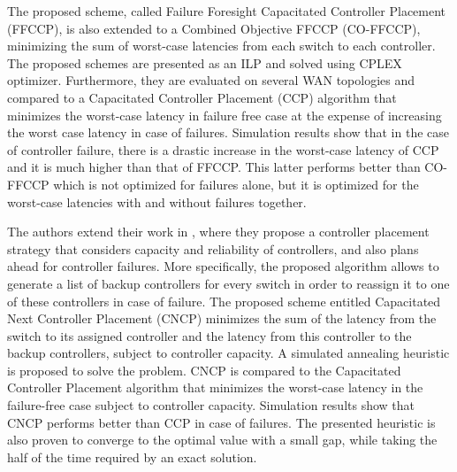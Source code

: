 \documentclass[a4paper,10pt]{article}
\begin{document}
The proposed scheme, called Failure Foresight Capacitated Controller Placement (FFCCP), is also extended to a Combined Objective FFCCP (CO-FFCCP), minimizing the sum of worst-case latencies from each switch to each controller. The proposed schemes are presented as an ILP and solved using CPLEX optimizer. Furthermore, they are evaluated on several WAN topologies and compared to a Capacitated Controller Placement (CCP) algorithm that minimizes the worst-case latency in failure free case at the expense of increasing the worst case latency in case of failures. Simulation results show that in the case of controller failure,  there is a drastic increase in the worst-case latency of CCP and it is much higher than that of FFCCP. This latter performs better than CO-FFCCP which is not optimized for failures alone, but it is optimized for the worst-case latencies with and without failures together. 

The authors extend their work in \cite{KiRa17}, where they propose a controller placement strategy that considers capacity and reliability of controllers, and also plans ahead for controller failures. More specifically, the proposed algorithm allows to generate a list of backup controllers for every switch in order to reassign it to one of these controllers in case of failure. The proposed scheme entitled Capacitated Next Controller Placement (CNCP) minimizes the sum of the latency from the switch to its assigned controller and the latency from this controller to the backup controllers, subject to controller capacity. A simulated annealing heuristic is proposed to solve the problem. CNCP is compared to the Capacitated Controller Placement algorithm that minimizes the worst-case latency in the failure-free case subject to controller capacity. Simulation results show that CNCP performs better than CCP in case of failures. The presented heuristic is also proven to converge to the optimal value with a small gap, while taking the half of the time required by an exact solution. 

\end{document}

